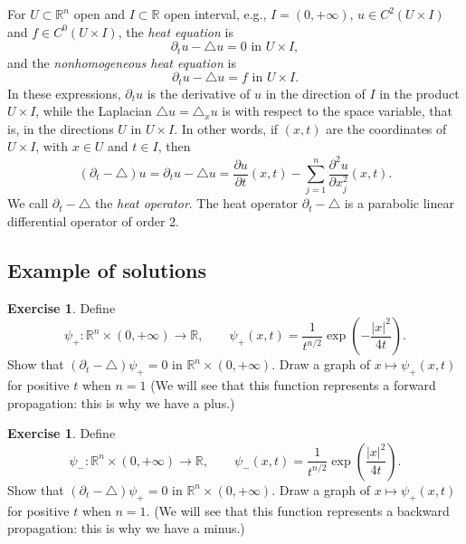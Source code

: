 \documentclass[a4paper,9pt]{amsart}
\newcommand{\R}{\mathbb{R}}	%
\newcommand{\de}{\partial}		%
\newcommand{\laplacian}{\triangle}
\theoremstyle{plain}
\theoremstyle{definition}
\newtheorem{exercise}[proposition]{Exercise}%
\theoremstyle{remark}
\begin{document}
For $U\subset\R^n$ open and $I\subset\R$ open interval, e.g., $I=(0,+\infty)$,
$u\in C^2(U\times I)$ and $f\in C^0(U\times I)$,
the \emph{heat equation} is
\begin{equation}
	\de_t u - \laplacian u = 0 \text{ in } U\times I ,
\end{equation}
and the \emph{nonhomogeneous heat equation} is
\begin{equation}
	\de_t u - \laplacian u = f \text{ in } U\times I .
\end{equation}
In these expressions, $\de_tu$ is the derivative of $u$ in the direction of $I$ in the product $U\times I$, 
while the Laplacian $\laplacian u = \laplacian_x u$ is with respect to the space variable, that is, in the directions $U$ in $U\times I$.
In other words, if $(x,t)$ are the coordinates of $U\times I$, with $x\in U$ and $t\in I$,
then
\[
(\de_t - \laplacian) u
=\de_t u - \laplacian u 
= \frac{\de u}{\de t}(x,t) - \sum_{j=1}^n \frac{\de^2u}{\de x_j^2}(x,t).
\]
We call $\de_t - \laplacian$ the \emph{heat operator}.
The heat operator $\de_t - \laplacian$ is a parabolic linear differential operator of order 2.

\subsection{Example of solutions}\label{subs67c45976}

\begin{exercise}
	Define 
	\begin{equation}
		\psi_+ : \R^n \times (0,+\infty) \to \R ,
		\qquad
		\psi_+(x,t) = \frac{1}{t^{n/2}} \exp\left(-\frac{|x|^2}{4t} \right) .
	\end{equation}
	Show that $(\de_t-\laplacian)\psi_+=0$ in $\R^n \times (0,+\infty)$.
	Draw a graph of $x\mapsto \psi_+(x,t)$ for positive $t$ when $n=1$
	(We will see that this function represents a forward propagation: this is why we have a plus.)
\end{exercise}

\begin{exercise}
	Define 
	\begin{equation}
		\psi_- : \R^n \times (0,+\infty) \to \R ,
		\qquad
		\psi_-(x,t) = \frac{1}{t^{n/2}} \exp\left(\frac{|x|^2}{4t} \right) .
	\end{equation}
	Show that $(\de_t-\laplacian)\psi_+=0$ in $\R^n \times (0,+\infty)$.
	Draw a graph of $x\mapsto \psi_+(x,t)$ for positive $t$ when $n=1$.
	(We will see that this function represents a backward propagation: this is why we have a minus.)
\end{exercise}
\end{document}

